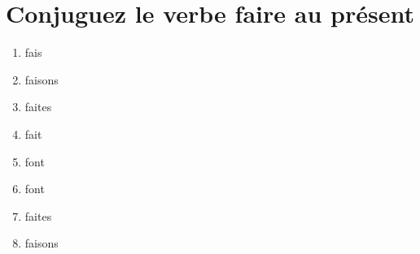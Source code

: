 \section{Conjuguez le verbe faire au présent}

\begin{enumerate}
    \item fais
    \item faisons
    \item faites
    \item fait
    \item font
    \item font
    \item faites
    \item faisons
\end{enumerate}